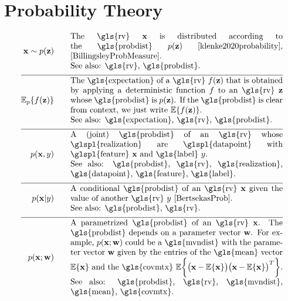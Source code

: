 \newpage
\section*{Probability Theory} 
\begin{align}
	\featurevec \sim p(\vz)  \quad\quad & \parbox{.75\textwidth}{The \gls{rv} $\featurevec$ is distributed according to 
		the \gls{probdist} $p(\vz)$ \cite{klenke2020probability}, \cite{BillingsleyProbMeasure}.
		\\ See also: \gls{rv}, \gls{probdist}.}  \nonumber \\[2mm] \hline \nonumber\\[-5mm]  
	\expect_{p} \{ f(\datapoint) \}  \quad\quad & \parbox{.75\textwidth}{The \gls{expectation} of a \gls{rv} $f(\datapoint)$ that 
		is obtained by applying a deterministic function $f$ to an \gls{rv}
		$\datapoint$ whose \gls{probdist} is $\prob{\datapoint}$. If the \gls{probdist} is clear from context, 
		we just write $\expect \{ f(\datapoint) \}$. 
		\\ See also: \gls{expectation}, \gls{rv}, \gls{probdist}.}  \nonumber \\[2mm] \hline \nonumber\\[-5mm]    
	\prob{\featurevec,\truelabel} \quad\quad & \parbox{.75\textwidth}{A (joint) \gls{probdist} of an \gls{rv} 
		whose \glspl{realization} are \glspl{datapoint} with \glspl{feature} $\featurevec$ and \gls{label} $\truelabel$.
		\\ See also: \gls{probdist}, \gls{rv}, \gls{realization}, \gls{datapoint}, \gls{feature}, 
		\gls{label}.} \nonumber        \nonumber \\[2mm] \hline \nonumber\\[-5mm]        
	\prob{\featurevec|\truelabel} \quad\quad & \parbox{.75\textwidth}{A conditional \gls{probdist} of an \gls{rv} 
		$\featurevec$ given the value of another \gls{rv} $\truelabel$ \cite[Sec.\ 3.5]{BertsekasProb}. 
		\\ See also: \gls{probdist}, \gls{rv}. } \nonumber       \nonumber \\[2mm] \hline \nonumber\\[-5mm]           
	\prob{\featurevec;\weights} \quad\quad & \parbox{.75\textwidth}{A parametrized \gls{probdist} of an \gls{rv} $\featurevec$. 
		The \gls{probdist} depends on a parameter vector $\weights$. For example, $\prob{\featurevec;\weights}$ could be a 
		\gls{mvndist} with the parameter vector $\weights$ given by the entries of the \gls{mean} vector $\expect \{ \featurevec \}$ 
		and the \gls{covmtx} $\expect \bigg \{ \big( \featurevec - \expect \{ \featurevec \}\big) \big( \featurevec - \expect \{ \featurevec \}\big)^{T}  \bigg\}$.
		\\ See also: \gls{probdist}, \gls{rv}, \gls{mvndist}, \gls{mean}, \gls{covmtx}.} \nonumber           \nonumber 
\end{align} 
